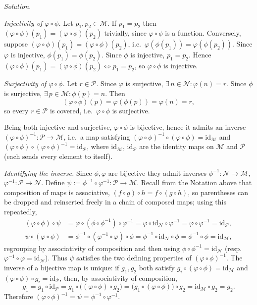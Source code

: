 \documentclass[11pt]{article}
\begin{document}
\medskip
\noindent\textit{Solution.}

\emph{Injectivity of $\varphi\circ\phi$.} Let $p_1, p_2 \in \mathcal{M}$. If $p_1 = p_2$ then $(\varphi\circ\phi)(p_1) = (\varphi\circ\phi)(p_2)$ trivially, since $\varphi\circ\phi$ is a function. Conversely, suppose $(\varphi\circ\phi)(p_1) = (\varphi\circ\phi)(p_2)$, i.e.\ $\varphi(\phi(p_1)) = \varphi(\phi(p_2))$. Since $\varphi$ is injective, $\phi(p_1) = \phi(p_2)$. Since $\phi$ is injective, $p_1 = p_2$. Hence $(\varphi\circ\phi)(p_1) = (\varphi\circ\phi)(p_2) \iff p_1 = p_2$, so $\varphi\circ\phi$ is injective.

\emph{Surjectivity of $\varphi\circ\phi$.} Let $r \in \mathcal{P}$. Since $\varphi$ is surjective, $\exists\, n \in \mathcal{N} : \varphi(n) = r$. Since $\phi$ is surjective, $\exists\, p \in \mathcal{M} : \phi(p) = n$. Then
\[
(\varphi\circ\phi)(p) = \varphi(\phi(p)) = \varphi(n) = r,
\]
so every $r \in \mathcal{P}$ is covered, i.e.\ $\varphi\circ\phi$ is surjective.

Being both injective and surjective, $\varphi\circ\phi$ is bijective, hence it admits an inverse $(\varphi\circ\phi)^{-1} : \mathcal{P} \to \mathcal{M}$, i.e.\ a map satisfying $(\varphi\circ\phi)^{-1}\circ(\varphi\circ\phi) = \mathrm{id}_{\mathcal{M}}$ and $(\varphi\circ\phi)\circ(\varphi\circ\phi)^{-1} = \mathrm{id}_{\mathcal{P}}$, where $\mathrm{id}_{\mathcal M}$, $\mathrm{id}_{\mathcal P}$ are the identity maps on $\mathcal M$ and $\mathcal P$ (each sends every element to itself).

\emph{Identifying the inverse.} Since $\phi, \varphi$ are bijective they admit inverses $\phi^{-1} : \mathcal{N}\to\mathcal{M}$, $\varphi^{-1}:\mathcal{P}\to\mathcal{N}$. Define $\psi := \phi^{-1}\circ\varphi^{-1} : \mathcal{P}\to\mathcal{M}$. Recall from the Notation above that composition of maps is associative, $(f\circ g)\circ h = f\circ(g\circ h)$, so parentheses can be dropped and reinserted freely in a chain of composed maps; using this repeatedly,
\begin{align*}
(\varphi\circ\phi)\circ\psi &= \varphi\circ(\phi\circ\phi^{-1})\circ\varphi^{-1} = \varphi\circ\mathrm{id}_{\mathcal{N}}\circ\varphi^{-1} = \varphi\circ\varphi^{-1} = \mathrm{id}_{\mathcal{P}}, \\
\psi\circ(\varphi\circ\phi) &= \phi^{-1}\circ(\varphi^{-1}\circ\varphi)\circ\phi = \phi^{-1}\circ\mathrm{id}_{\mathcal{N}}\circ\phi = \phi^{-1}\circ\phi = \mathrm{id}_{\mathcal{M}},
\end{align*}
regrouping by associativity of composition and then using $\phi\circ\phi^{-1}=\mathrm{id}_{\mathcal N}$ (resp.\ $\varphi^{-1}\circ\varphi=\mathrm{id}_{\mathcal N}$).
Thus $\psi$ satisfies the two defining properties of $(\varphi\circ\phi)^{-1}$. The inverse of a bijective map is unique: if $g_1, g_2$ both satisfy $g_i\circ(\varphi\circ\phi) = \mathrm{id}_{\mathcal{M}}$ and $(\varphi\circ\phi)\circ g_i = \mathrm{id}_{\mathcal{P}}$, then, by associativity of composition,
\[
g_1 = g_1\circ\mathrm{id}_{\mathcal{P}} = g_1\circ\big((\varphi\circ\phi)\circ g_2\big) = \big(g_1\circ(\varphi\circ\phi)\big)\circ g_2 = \mathrm{id}_{\mathcal{M}}\circ g_2 = g_2.
\]
Therefore $(\varphi\circ\phi)^{-1} = \psi = \phi^{-1}\circ\varphi^{-1}$.
\end{document}
